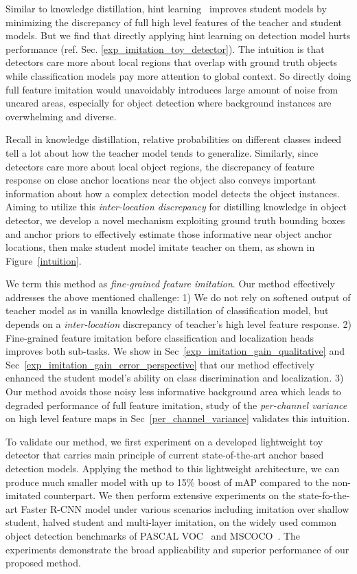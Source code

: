 \documentclass[10pt,twocolumn,letterpaper]{article}
\begin{document}
Similar to knowledge distillation, hint learning~\cite{romero2014fitnets} improves student models by minimizing the discrepancy of full high level features of the teacher and student models. But we find that directly applying hint learning on detection model hurts performance (ref. Sec. \ref{exp_imitation_toy_detector}). The intuition is that detectors care more about local regions that overlap with ground truth objects while classification models pay more attention to global context. So directly doing full feature imitation would unavoidably introduces large amount of noise from uncared areas, especially for object detection where background instances are overwhelming and diverse. 

Recall in knowledge distillation, relative probabilities on different classes indeed tell a lot about how the teacher model tends to generalize. Similarly, since detectors care more about local object regions, the discrepancy of feature response on close anchor locations near the object also conveys important information about how a complex detection model detects the object instances. Aiming to utilize this \emph{inter-location discrepancy} for distilling knowledge in object detector, we develop a novel mechanism exploiting ground truth bounding boxes and anchor priors to effectively estimate those informative near object anchor locations, then make student model imitate teacher on them, as shown in Figure~\ref{intuition}. 

We term this method as \emph{fine-grained feature imitation}. Our method effectively addresses the above mentioned challenge: 1) We do not rely on softened output of teacher model as in vanilla knowledge distillation of classification model, but depends on a \emph{inter-location} discrepancy of teacher's high level feature response. 2) Fine-grained feature imitation before classification and localization heads improves both sub-tasks. We show in Sec~\ref{exp_imitation_gain_qualitative} and Sec~\ref{exp_imitation_gain_error_perspective} that our method effectively enhanced the student model's ability on class discrimination and localization. 3) Our method avoids those noisy less informative background area which leads to degraded performance of full feature imitation, study of the \emph{per-channel variance} on high level feature maps in Sec~\ref{per_channel_variance} validates this intuition.

To validate our method, we first experiment on a developed lightweight toy detector that carries main principle of current state-of-the-art anchor based detection models. Applying the method to this  lightweight architecture, we can produce much smaller model with up to 15\% boost of mAP compared to the non-imitated counterpart. We then perform extensive experiments on the state-fo-the-art Faster R-CNN model under various scenarios including imitation over shallow student, halved student and multi-layer imitation, on the widely used common object detection benchmarks of PASCAL VOC~\cite{everingham2010pascal} and MSCOCO~\cite{lin2014microsoft}. The experiments demonstrate the broad applicability and superior performance of our proposed method. 
\end{document}
